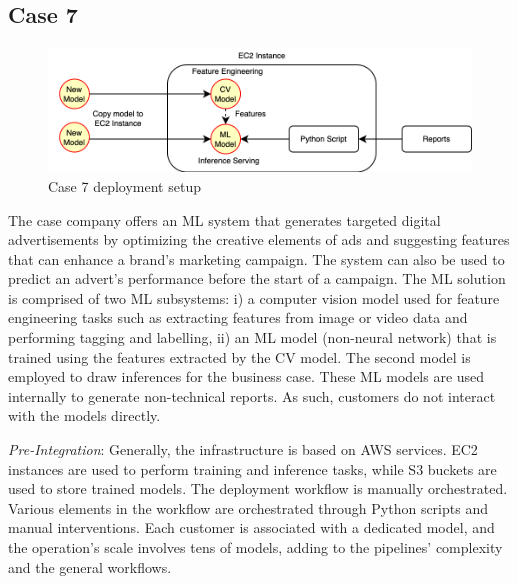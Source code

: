 \subsection*{Case 7} %
\label{case: 7}

\begin{figure}[b]
\centering
\includegraphics[width=\linewidth]{images/case7_deployment_process.png}
\caption{Case 7 deployment setup}
\label{fig: case7_deployment_process}
\end{figure}


The case company offers an ML system that generates targeted digital advertisements by optimizing the creative elements of ads and suggesting features that can enhance a brand's marketing campaign. The system can also be used to predict an advert's performance before the start of a campaign. The ML solution is comprised of two ML subsystems: i) a computer vision model used for feature engineering tasks such as extracting features from image or video data and performing tagging and labelling, ii) an ML model (non-neural network) that is trained using the features extracted by the CV model. The second model is employed to draw inferences for the business case. These ML models are used internally to generate non-technical reports. As such, customers do not interact with the models directly. %

\textit{Pre-Integration}: Generally, the infrastructure is based on AWS services. EC2 instances are used to perform training and inference tasks, while S3 buckets are used to store trained models. The deployment workflow is manually orchestrated. Various elements in the workflow are orchestrated through Python scripts and manual interventions. Each customer is associated with a dedicated model, and the operation's scale involves tens of models, adding to the pipelines' complexity and the general workflows.

